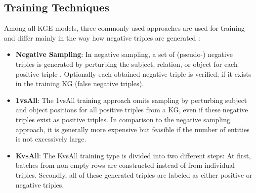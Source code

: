 \subsection{Training Techniques}
\label{subsec:training_techniques}
%
Among all \ac{KGE} models, three commonly used approaches are used for training and differ mainly in the way how negative triples are generated \cite{Ruffinelli2020You}:
\begin{itemize}
    \item  
    \textbf{Negative Sampling}:
    In negative sampling, a set of (pseudo-) negative triples is generated by perturbing the subject, relation, or object for each positive triple .
    Optionally each obtained negative triple is verified, if it exists in the training \ac{KG} (false negative triples).
    
    \item  
    \textbf{1vsAll}:
    The 1vsAll training approach omits sampling by perturbing subject and object positions for all positive triples from a \ac{KG}, even if these negative triples exist as positive triples.
    In comparison to the negative sampling approach, it is generally more expensive but feasible if the number of entities is not excessively large.
        
    \item  
    \textbf{KvsAll}: 
    The KvsAll training type is divided into two different steps:
    At first, batches from non-empty rows are constructed instead of from individual triples.
    Secondly, all of these generated triples are labeled as either positive or negative triples.
\end{itemize}